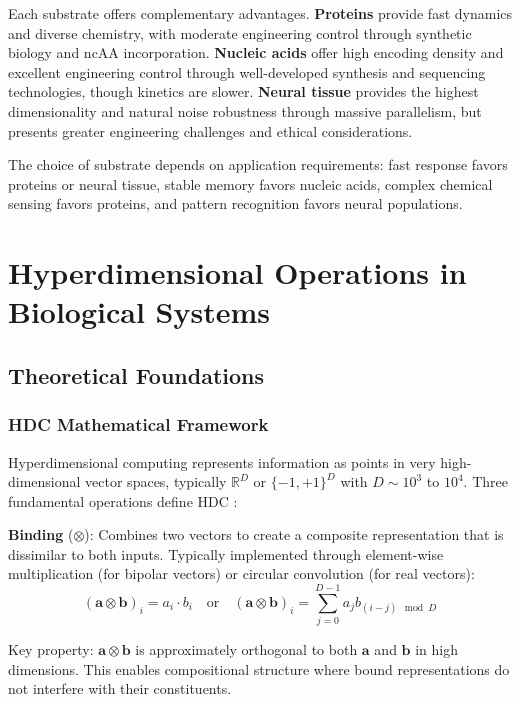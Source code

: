\documentclass[12pt]{article}
\begin{document}
Each substrate offers complementary advantages. \textbf{Proteins} provide fast dynamics and diverse chemistry, with moderate engineering control through synthetic biology and ncAA incorporation. \textbf{Nucleic acids} offer high encoding density and excellent engineering control through well-developed synthesis and sequencing technologies, though kinetics are slower. \textbf{Neural tissue} provides the highest dimensionality and natural noise robustness through massive parallelism, but presents greater engineering challenges and ethical considerations.

The choice of substrate depends on application requirements: fast response favors proteins or neural tissue, stable memory favors nucleic acids, complex chemical sensing favors proteins, and pattern recognition favors neural populations.

\section{Hyperdimensional Operations in Biological Systems}

\subsection{Theoretical Foundations}

\subsubsection{HDC Mathematical Framework}

Hyperdimensional computing represents information as points in very high-dimensional vector spaces, typically $\mathbb{R}^D$ or $\{-1,+1\}^D$ with $D \sim 10^3$ to $10^4$. Three fundamental operations define HDC \citep{Kanerva2009}:

\textbf{Binding} ($\otimes$): Combines two vectors to create a composite representation that is dissimilar to both inputs. Typically implemented through element-wise multiplication (for bipolar vectors) or circular convolution (for real vectors):
\begin{equation}
(\mathbf{a} \otimes \mathbf{b})_i = a_i \cdot b_i \quad \text{or} \quad (\mathbf{a} \otimes \mathbf{b})_i = \sum_{j=0}^{D-1} a_j b_{(i-j) \mod D}
\end{equation}

Key property: $\mathbf{a} \otimes \mathbf{b}$ is approximately orthogonal to both $\mathbf{a}$ and $\mathbf{b}$ in high dimensions. This enables compositional structure where bound representations do not interfere with their constituents.
\end{document}
